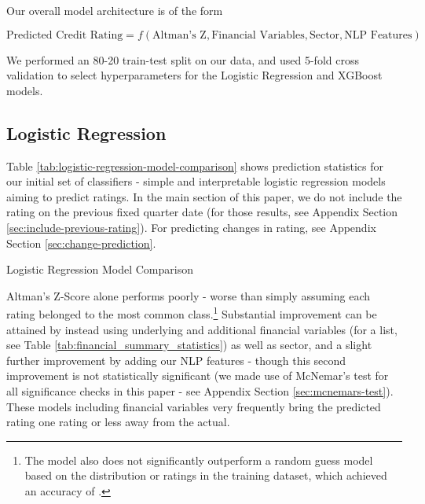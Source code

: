 \documentclass{article}[11pt]
\begin{document}
    Our overall model architecture is of the form

    \begin{equation*}
        \text{Predicted Credit Rating} = f(\text{Altman's Z}, \text{Financial Variables}, \text{Sector}, \text{NLP Features})
    \end{equation*}

    We performed an 80-20 train-test split on our data, and used 5-fold cross validation to select hyperparameters for the Logistic Regression and XGBoost models.

    \subsection*{Logistic Regression}

    Table \ref{tab:logistic-regression-model-comparison} shows prediction statistics for our initial set of classifiers - simple and interpretable logistic regression models aiming to predict ratings. In the main section of this paper, we do not include the rating on the previous fixed quarter date (for those results, see Appendix Section \ref{sec:include-previous-rating}). For predicting changes in rating, see Appendix Section \ref{sec:change-prediction}.
    
    \begin{table}[h!]
        \centering
        \caption{Logistic Regression Model Comparison}
        
        \label{tab:logistic-regression-model-comparison}
    \end{table}

    Altman's Z-Score alone performs poorly - worse than simply assuming each rating belonged to the most common class.\footnote{The model also does not significantly outperform a random guess model based on the distribution or ratings in the training dataset, which achieved an accuracy of \ratingRGAcc.} Substantial improvement can be attained by instead using underlying and additional financial variables (for a list, see Table \ref{tab:financial_summary_statistics}) as well as sector, and a slight further improvement by adding our NLP features - though this second improvement is not statistically significant (we made use of McNemar's test for all significance checks in this paper - see Appendix Section \ref{sec:mcnemars-test}). These models including financial variables very frequently bring the predicted rating one rating or less away from the actual.
\end{document}
